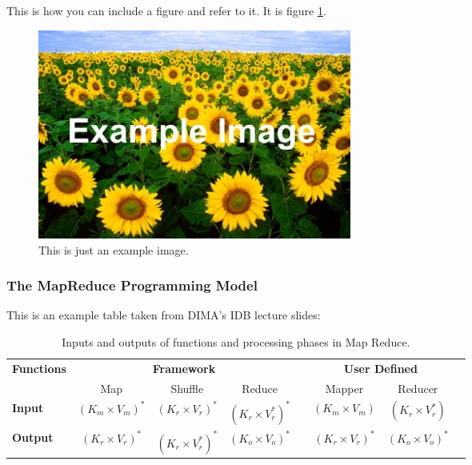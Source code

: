 This is how you can include a figure and refer to it. It is figure \ref{fig:Example}.

\begin{figure}[h!]
	\begin{center}
		\includegraphics[width=0.5\textwidth]{images/Example.jpg}
		\caption{This is just an example image.}
		\label{fig:Example}
	\end{center}
\end{figure}

\FloatBarrier

\subsubsection{The MapReduce Programming Model}
\label{sec:mapReduce}

This is an example table taken from DIMA's IDB lecture slides:

\begin{table}[h!]
  \begin{tabular}{lccccccc}
	\toprule    
    \hline
    \textbf{Functions} & \multicolumn{3}{c}{\textbf{Framework}} && \multicolumn{2}{c}{\textbf{User Defined}}\\
    \cmidrule{2-4}  \cmidrule{6-7}  
    & Map & Shuffle & Reduce && Mapper &  Reducer\\
    \midrule
    \textbf{Input} & $ (K_m \times V_m)^{*} $ & $ (K_r \times V_r)^{*} $ & $ (K_r \times V_r^{*})^{*} $ && $ (K_m \times V_m) $  & $ (K_r \times V_r^{*}) $\\
    \hline
    \textbf{Output} & $ (K_r \times V_r)^{*} $ & $ (K_r \times V_r^{*})^{*} $ & $ (K_o \times V_o)^{*} $ && $ (K_r \times V_r)^{*} $ & $ (K_o \times V_o)^{*} $\\
	\hline    
    \bottomrule
  \end{tabular}
  \caption{Inputs and outputs of functions and processing phases in Map Reduce.}
  \label{table:mapRedFunctions}
\end{table}


